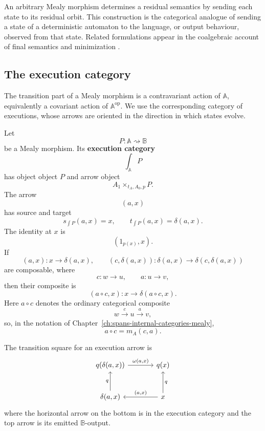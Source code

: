 An arbitrary Mealy morphism determines a residual semantics by sending each state to its residual orbit. This construction is the categorical analogue of sending a state of a deterministic automaton to the language, or output behaviour, observed from that state. Related formulations appear in the coalgebraic account of final semantics and minimization \cite{Rutten1998,Rutten2000}.

\subsection{The execution category}
\label{subsec:execution-category}

The transition part of a Mealy morphism is a contravariant action of \(\mathbb A\), equivalently a covariant action of \(\mathbb A^{\mathrm{op}}\). We use the corresponding category of executions, whose arrows are oriented in the direction in which states evolve.

\begin{definition}
\label{def:execution-category}
    Let
    \[
        P:\mathbb A\rightsquigarrow\mathbb B
    \]
    be a Mealy morphism. Its \textbf{execution category}
    \[
        \int_{\mathbb A}P
    \]
    has object object \(P\) and arrow object
    \[
        A_1\times_{t_A,A_0,p}P.
    \]
    The arrow
    \[
        (a,x)
    \]
    has source and target
    \[
        s_{\int P}(a,x)=x,
        \qquad
        t_{\int P}(a,x)=\delta(a,x).
    \]
    The identity at \(x\) is
    \[
        (1_{p(x)},x).
    \]
    If
    \[
        (a,x):x\to\delta(a,x),
        \qquad
        (c,\delta(a,x)):
        \delta(a,x)\to\delta(c,\delta(a,x))
    \]
    are composable, where
    \[
        c:w\to u,
        \qquad
        a:u\to v,
    \]
    then their composite is
    \[
        (a\circ c,x):x\to\delta(a\circ c,x).
    \]
    Here \(a\circ c\) denotes the ordinary categorical composite
    \[
        w\xrightarrow{c}u\xrightarrow{a}v,
    \]
    so, in the notation of Chapter~\ref{ch:spans-internal-categories-mealy},
    \[
        a\circ c=m_A(c,a).
    \]
\end{definition}

The transition square for an execution arrow is
\[
    \begin{tikzcd}[column sep=large, row sep=large]
            {q(\delta(a,x))}
                \arrow[r, "{\omega(a,x)}"]
        &
            {q(x)}
            \\
            {\delta(a,x)}
                \arrow[u, "q"]
        &
            {x}
                \arrow[l, "{(a,x)}"']
                \arrow[u, "q"']
    \end{tikzcd}
\]
where the horizontal arrow on the bottom is in the execution category and the top arrow is its emitted \(\mathbb B\)-output.

